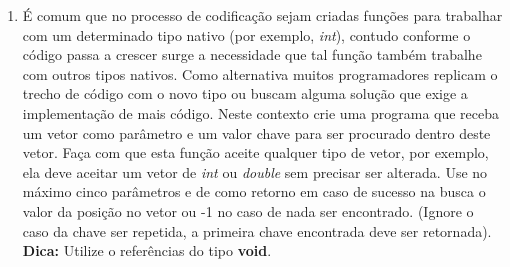 \documentclass[a4paper,10pt]{article}
\begin{document}
\begin{enumerate}
\begin{itemize}
       \item Linha 2: É uma linha de comentário.
       \item Linha 3: Fornece informações sobre o número de linhas e colunas de dados armazenados em um arquivo.
       \item Linha 4: Especifica o nível máximo de cinza contido na imagem.
      \end{itemize}
      Um exemplo da estrutura de uma imagem no formato PGM:\\
	\\P5 \\
	\#FGA\/SEM imagem gerada Ver.1.0 (0) \\
	10 10 \\
	255 \\
	0 1 2 3 4 5 6 7 8 9 10 11 12 13 14 15 16 17 18 19 20 21 22 23 24 25 \\
	26 27 28 28 30 31 32 33 34 35 36 37 38 39 40 41 42 43 44 45 46 47 \\
	48 49 50 51 52 53 54 55 56 57 58 59 60 61 62 63 64 65 66 67 68 69 70 \\ 
	71 72 73 74 75 76 77 78 79 80 81 82 83 84 85 86 87 88 89 90 91 92 93 \\
	255 255 255 255 255 255 \\
      Um efeito muito comum que costuma-se dar a esta imagem é o chamado negativo. Este faz com que a cor de cada pixel da imagem original se 
      transforme na cor inversa (por exemplo, um pixel branco se transforma em preto), a cor inversa é o valor da subtração entre 255 e o valor 
      do pixel. Com base nas informações dadas, faça um programa que leia uma imagem no formato PGM, tire o negativo dela e salve-a como uma nova
      imagem.
  \item É comum que no processo de codificação sejam criadas funções para trabalhar com um determinado tipo nativo (por exemplo, \emph{int}), 
      contudo conforme o código passa a crescer surge a necessidade que tal função também trabalhe com outros tipos nativos. Como alternativa muitos 
      programadores replicam o trecho de código com o novo tipo ou buscam alguma solução que exige a implementação de mais código. Neste contexto 
      crie uma programa que receba um vetor como parâmetro e um valor chave para ser procurado dentro deste vetor. Faça com que esta função aceite 
      qualquer tipo de vetor, por exemplo, ela deve aceitar um vetor de \emph{int} ou \emph{double} sem precisar ser alterada. Use no máximo cinco 
      parâmetros e de como retorno em caso de sucesso na busca o valor da posição no vetor ou -1 no caso de nada ser encontrado. (Ignore o caso da 
      chave ser repetida, a primeira chave encontrada deve ser retornada).
      \textbf{Dica:} Utilize o referências do tipo \textbf{void}.
 

\end{enumerate}
\end{document}
